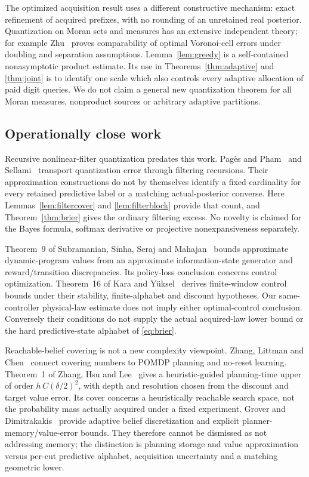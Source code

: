 The optimized acquisition result uses a different constructive mechanism: exact refinement of acquired prefixes, with no rounding of an unretained real posterior. Quantization on Moran sets and measures has an extensive independent theory; for example Zhu~\cite{zhu-moran} proves comparability of optimal Voronoi-cell errors under doubling and separation assumptions. Lemma~\ref{lem:greedy} is a self-contained nonasymptotic product estimate. Its use in Theorems~\ref{thm:adaptive} and \ref{thm:joint} is to identify one scale which also controls every adaptive allocation of paid digit queries. We do not claim a general new quantization theorem for all Moran measures, nonproduct sources or arbitrary adaptive partitions.

\subsection{Operationally close work}
Recursive nonlinear-filter quantization predates this work. Pag\`es and Pham~\cite{pages} and Sellami~\cite{sellami} transport quantization error through filtering recursions. Their approximation constructions do not by themselves identify a fixed cardinality for every retained predictive label or a matching actual-posterior converse. Here Lemmas~\ref{lem:filtercover} and \ref{lem:filterblock} provide that count, and Theorem~\ref{thm:brier} gives the ordinary filtering excess. No novelty is claimed for the Bayes formula, softmax derivative or projective nonexpansiveness separately.

Theorem~9 of Subramanian, Sinha, Seraj and Mahajan~\cite{ais} bounds approximate dynamic-program values from an approximate information-state generator and reward/transition discrepancies. Its policy-loss conclusion concerns control optimization. Theorem~16 of Kara and Y\"uksel~\cite{kara} derives finite-window control bounds under their stability, finite-alphabet and discount hypotheses. Our same-controller physical-law estimate does not imply either optimal-control conclusion. Conversely their conditions do not supply the actual acquired-law lower bound or the hard predictive-state alphabet of \eqref{eq:brier}.

Reachable-belief covering is not a new complexity viewpoint. Zhang, Littman and Chen~\cite{zhang2012} connect covering numbers to POMDP planning and no-reset learning. Theorem~1 of Zhang, Hsu and Lee~\cite{zhang2014} gives a heuristic-guided planning-time upper of order $h\,C(\delta/2)^2$, with depth and resolution chosen from the discount and target value error. Its cover concerns a heuristically reachable search space, not the probability mass actually acquired under a fixed experiment. Grover and Dimitrakakis~\cite{grover} provide adaptive belief discretization and explicit planner-memory/value-error bounds. They therefore cannot be dismissed as not addressing memory; the distinction is planning storage and value approximation versus per-cut predictive alphabet, acquisition uncertainty and a matching geometric lower.

